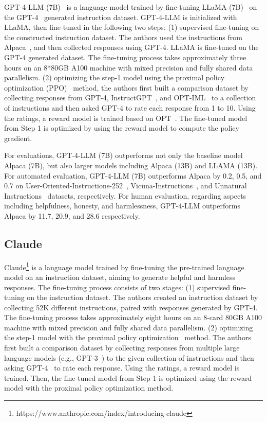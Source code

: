 \documentclass[11pt]{article}
\begin{document}
GPT-4-LLM (7B)~\citep{peng2023instruction} is a language model trained by fine-tuning LLaMA (7B)~\citep{Touvron2023LLaMAOA} on the GPT-4~\citep{OpenAI2023GPT4TR} generated instruction dataset. 
GPT-4-LLM is initialized with LLaMA, then fine-tuned in the following two steps: 
(1) supervised fine-tuning on the constructed instruction dataset. The authors used the instructions from Alpaca~\citep{taori2023alpaca}, and then collected  responses  using GPT-4.  LLaMA is  fine-tuned on the GPT-4 generated dataset. The fine-tuning process takes approximately three hours on an 8*80GB A100 machine with mixed precision and fully shared data parallelism.
(2) optimizing the step-1 model  using the proximal policy optimization (PPO)~\citep{Schulman2017ProximalPO} method, the authors first built a comparison dataset by collecting responses from GPT-4, InstructGPT~\citep{ouyang2022training}, and OPT-IML~\citep{Iyer2022OPTIMLSL}  to a collection of instructions and then asked GPT-4 to rate each response from 1 to 10. Using the ratings, a reward model is trained based on OPT~\citep{Zhang2022OPTOP}. The fine-tuned model from Step 1 is optimized by using the reward model to compute the policy gradient.

For evaluations, GPT-4-LLM (7B) outperforms not only the baseline model Alpaca (7B), but also larger models including Alpaca (13B) and LLAMA (13B). 
For automated evaluation, GPT-4-LLM (7B) outperforms Alpaca by 0.2, 0.5, and 0.7 on User-Oriented-Instructions-252~\citep{wang2022self}, Vicuna-Instructions~\citep{chiang2023vicuna}, and Unnatural Instructions~\citep{honovich2022unnatural} datasets, respectively. For human evaluation, regarding aspects including helpfulness, honesty, and harmlessness, GPT-4-LLM outperforms Alpaca by 11.7, 20.9, and 28.6 respectively.


\subsection{Claude}
Claude\footnote{https://www.anthropic.com/index/introducing-claude} is a language model trained by fine-tuning the pre-trained language model on an instruction dataset, aiming to generate helpful and harmless responses.
The fine-tuning process consists of two stages:
(1) supervised fine-tuning on the instruction dataset. The authors created an instruction dataset by collecting 52K different instructions, paired with responses generated by GPT-4. 
The fine-tuning process takes approximately eight hours on an 8-card 80GB A100 machine with mixed precision and fully shared data parallelism. 
(2) optimizing the step-1 model with the proximal policy optimization~\citep{Schulman2017ProximalPO} method. 
The authors first built a comparison dataset by collecting responses from multiple large language models (e.g., GPT-3~\citep{Brown2020LanguageMA}) to the given collection of instructions and then asking GPT-4~\citep{OpenAI2023GPT4TR} to rate each response. Using the ratings, a reward model is trained. Then, the fine-tuned model from Step 1 is optimized 
using the reward model
with the proximal policy optimization method.
\end{document}
